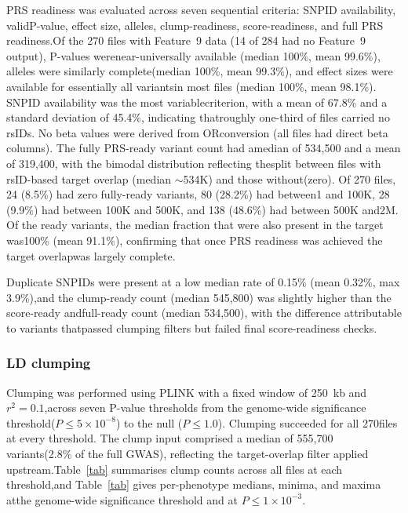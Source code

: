 \documentclass[11pt,a4paper]{article}
\begin{document}
PRS readiness was evaluated across seven sequential criteria: SNPID availability, validP-value, effect size, alleles, clump-readiness, score-readiness, and full PRS readiness.Of the 270 files with Feature~9 data (14 of 284 had no Feature~9 output), P-values werenear-universally available (median 100\%, mean 99.6\%), alleles were similarly complete(median 100\%, mean 99.3\%), and effect sizes were available for essentially all variantsin most files (median 100\%, mean 98.1\%). SNPID availability was the most variablecriterion, with a mean of 67.8\% and a standard deviation of 45.4\%, indicating thatroughly one-third of files carried no rsIDs. No beta values were derived from ORconversion (all files had direct beta columns). The fully PRS-ready variant count had amedian of 534,500 and a mean of 319,400, with the bimodal distribution reflecting thesplit between files with rsID-based target overlap (median $\sim$534K) and those without(zero). Of 270 files, 24 (8.5\%) had zero fully-ready variants, 80 (28.2\%) had between1 and 100K, 28 (9.9\%) had between 100K and 500K, and 138 (48.6\%) had between 500K and2M. Of the ready variants, the median fraction that were also present in the target was100\% (mean 91.1\%), confirming that once PRS readiness was achieved the target overlapwas largely complete.

Duplicate SNPIDs were present at a low median rate of 0.15\% (mean 0.32\%, max 3.9\%),and the clump-ready count (median 545,800) was slightly higher than the score-ready andfull-ready count (median 534,500), with the difference attributable to variants thatpassed clumping filters but failed final score-readiness checks.

\subsubsection*{LD clumping}

Clumping was performed using PLINK with a fixed window of 250~kb and $r^{2} = 0.1$,across seven P-value thresholds from the genome-wide significance threshold($P \leq 5\times10^{-8}$) to the null ($P \leq 1.0$). Clumping succeeded for all 270files at every threshold. The clump input comprised a median of 555,700 variants(2.8\% of the full GWAS), reflecting the target-overlap filter applied upstream.Table~\ref{tab} summarises clump counts across all files at each threshold,and Table~\ref{tab} gives per-phenotype medians, minima, and maxima atthe genome-wide significance threshold and at $P \leq 1\times10^{-3}$.
\end{document}
